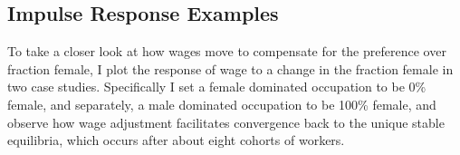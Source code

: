 \documentclass[11pt]{article}
\begin{document}

	


	



\subsection{Impulse Response Examples}
To take a closer look at how wages move to compensate for the preference over fraction female, I plot the response of wage to a change in the fraction female in two case studies. Specifically I set a female dominated occupation to be 0\% female, and separately, a male dominated occupation to be 100\% female, and observe how wage adjustment facilitates convergence back to the unique stable equilibria, which occurs after about eight cohorts of workers.

\end{document}
